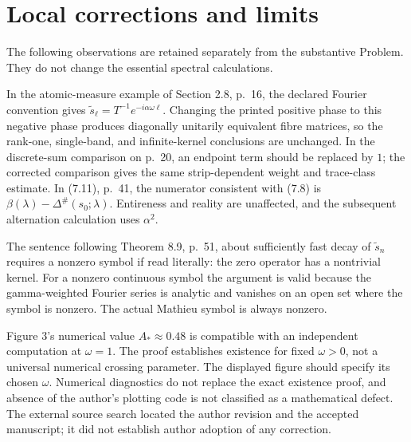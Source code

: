 \documentclass[10pt]{article}
\begin{document}
\section*{Local corrections and limits}
The following observations are retained separately from the substantive Problem. They do not change the essential spectral calculations.\par
In the atomic-measure example of Section 2.8, p. 16, the declared Fourier convention gives \(\widetilde s_\ell=T^{-1}e^{-i\alpha\omega\ell}\). Changing the printed positive phase to this negative phase produces diagonally unitarily equivalent fibre matrices, so the rank-one, single-band, and infinite-kernel conclusions are unchanged. In the discrete-sum comparison on p. 20, an endpoint term should be replaced by \(1\); the corrected comparison gives the same strip-dependent weight and trace-class estimate. In (7.11), p. 41, the numerator consistent with (7.8) is \(\beta(\lambda)-\Delta^\#(s_0;\lambda)\). Entireness and reality are unaffected, and the subsequent alternation calculation uses \(\alpha^2\).\par
The sentence following Theorem 8.9, p. 51, about sufficiently fast decay of \(\widetilde s_n\) requires a nonzero symbol if read literally: the zero operator has a nontrivial kernel. For a nonzero continuous symbol the argument is valid because the gamma-weighted Fourier series is analytic and vanishes on an open set where the symbol is nonzero. The actual Mathieu symbol is always nonzero.\par
Figure 3’s numerical value \(A_*\approx0.48\) is compatible with an independent computation at \(\omega=1\). The proof establishes existence for fixed \(\omega>0\), not a universal numerical crossing parameter. The displayed figure should specify its chosen \(\omega\). Numerical diagnostics do not replace the exact existence proof, and absence of the author’s plotting code is not classified as a mathematical defect. The external source search located the author revision and the accepted manuscript; it did not establish author adoption of any correction.\par
\end{document}
